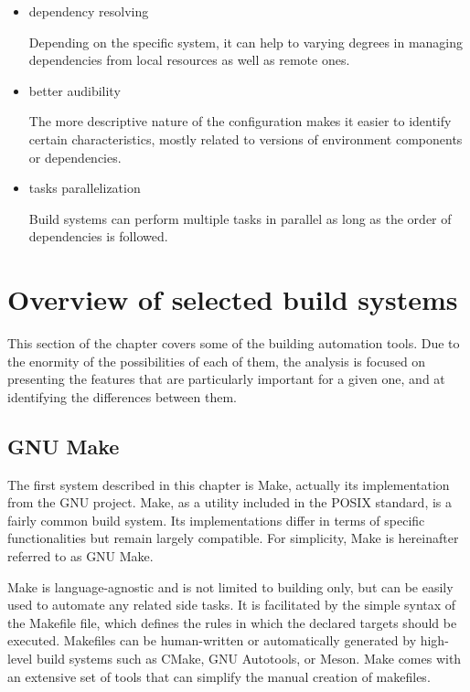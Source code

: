 \begin{itemize}
\item
  dependency resolving

Depending on the specific system, it can help to varying degrees in
managing dependencies from local resources as well as remote ones.
\end{itemize}

\begin{itemize}
\item
  better audibility

The more descriptive nature of the configuration makes it easier to
identify certain characteristics, mostly related to versions of
environment components or dependencies.
\end{itemize}

\begin{itemize}
\item
  tasks parallelization

Build systems can perform multiple tasks in parallel as long as the order
of dependencies is followed.
\end{itemize}

\hypertarget{overview-of-selected-build-systems}{%
\section{Overview of selected build
systems}\label{overview-of-selected-build-systems}}

This section of the chapter covers some of the building automation
tools. Due to the enormity of the possibilities of each of them, the
analysis is focused on presenting the features that are particularly
important for a given one, and at identifying the differences between
them.

\hypertarget{gnu-make}{%
\subsection{GNU Make}\label{gnu-make}}

The first system described in this chapter is Make, actually its
implementation from the GNU project. Make, as a utility included in the
POSIX standard\cite{MAKEPOSIX}, is a fairly common build system. Its implementations
differ in terms of specific functionalities but remain largely
compatible. For simplicity, Make is hereinafter referred to as GNU Make.

Make is language-agnostic and is not limited to building only, but can
be easily used to automate any related side tasks. It is facilitated by
the simple syntax of the Makefile file, which defines the rules in which
the declared targets should be executed. Makefiles can be human-written
or automatically generated by high-level build systems such as CMake,
GNU Autotools, or Meson. Make comes with an extensive set of tools that
can simplify the manual creation of makefiles.

